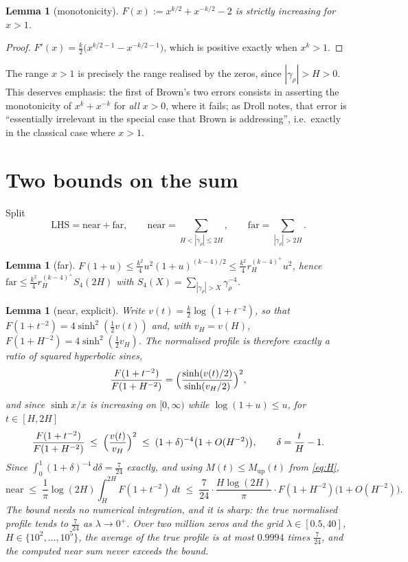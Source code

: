 \documentclass[11pt]{article}
\newtheorem{lemma}[theorem]{Lemma}
\theoremstyle{definition}
\begin{document}
\begin{lemma}[monotonicity]\label{lem:mono}
$F(x):=x^{k/2}+x^{-k/2}-2$ is strictly increasing for $x>1$.
\end{lemma}
\begin{proof}
$F'(x)=\tfrac k2\bigl(x^{k/2-1}-x^{-k/2-1}\bigr)$, which is positive exactly when $x^{k}>1$.
\end{proof}

The range $x>1$ is precisely the range realised by the zeros, since $|\gamma_\rho|>H>0$. This deserves
emphasis: the first of Brown's two errors consists in asserting the monotonicity of $x^{k}+x^{-k}$ for
\emph{all} $x>0$, where it fails; as Droll notes, that error is ``essentially irrelevant in the special
case that Brown is addressing'', i.e.\ exactly in the classical case where $x>1$.

\section{Two bounds on the sum}\label{sec:bounds}
Split
\[
\mathrm{LHS}=\mathrm{near}+\mathrm{far},\qquad
\mathrm{near}=\sum_{H<|\gamma_\rho|\le 2H},\qquad \mathrm{far}=\sum_{|\gamma_\rho|>2H}.
\]

\begin{lemma}[far]\label{lem:far}
$F(1+u)\le\frac{k^{2}}4u^{2}(1+u)^{(k-4)/2}\le\frac{k^{2}}4r_H^{(k-4)^{+}}u^{2}$, hence
$\mathrm{far}\le\frac{k^{2}}4r_H^{(k-4)^{+}}S_4(2H)$ with $S_4(X)=\sum_{|\gamma_\rho|>X}\gamma_\rho^{-4}$.
\end{lemma}

\begin{lemma}[near, explicit]\label{lem:near}
Write $v(t)=\tfrac k2\log(1+t^{-2})$, so that $F(1+t^{-2})=4\sinh^{2}(\tfrac12v(t))$ and, with
$v_H=v(H)$, $F(1+H^{-2})=4\sinh^{2}(\tfrac12v_H)$. The normalised profile is therefore exactly a ratio of
squared hyperbolic sines,
\[
\frac{F(1+t^{-2})}{F(1+H^{-2})}=\Bigl(\frac{\sinh(v(t)/2)}{\sinh(v_H/2)}\Bigr)^{2},
\]
and since $\sinh x/x$ is increasing on $[0,\infty)$ while $\log(1+u)\le u$, for $t\in[H,2H]$
\[
\frac{F(1+t^{-2})}{F(1+H^{-2})}\;\le\;\Bigl(\frac{v(t)}{v_H}\Bigr)^{2}
\;\le\;(1+\delta)^{-4}\bigl(1+O(H^{-2})\bigr),\qquad \delta=\frac tH-1 .
\]
Since $\int_0^{1}(1+\delta)^{-4}\,d\delta=\tfrac7{24}$ exactly, and using $M(t)\le M_{\mathrm{up}}(t)$
from \eqref{eq:H},
\[
\mathrm{near}\;\le\;\frac1\pi\log(2H)\int_H^{2H}F(1+t^{-2})\,dt
\;\le\;\frac7{24}\cdot\frac{H\log(2H)}{\pi}\cdot F(1+H^{-2})\bigl(1+O(H^{-2})\bigr).
\]
The bound needs no numerical integration, and it is sharp: the true normalised profile tends to
$\tfrac7{24}$ as $\lambda\to0^{+}$. Over two million zeros and the grid
$\lambda\in[0.5,40]$, $H\in\{10^{2},\dots,10^{5}\}$, the average of the true profile is at most
$0.9994$ times $\tfrac7{24}$, and the computed near sum never exceeds the bound.
\end{lemma}
\end{document}
